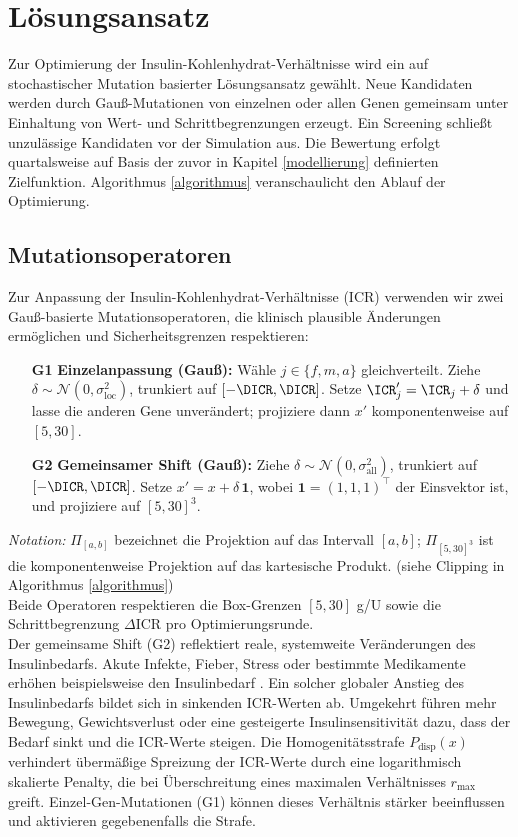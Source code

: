 \newcommand{\sigmaall}{\sigma_{\text{all}}}
\newcommand{\sigmaloc}{\sigma_{\text{loc}}}

\section{Lösungsansatz}
Zur Optimierung der Insulin-Kohlenhydrat-Verhältnisse wird ein auf stochastischer Mutation basierter Lösungsansatz gewählt. Neue Kandidaten werden durch Gauß-Mutationen von einzelnen oder allen Genen gemeinsam unter Einhaltung von Wert- und Schrittbegrenzungen erzeugt. Ein Screening schließt unzulässige Kandidaten vor der Simulation aus. Die Bewertung erfolgt quartalsweise auf Basis der zuvor in Kapitel \ref{modellierung} definierten Zielfunktion. Algorithmus \ref{algorithmus} veranschaulicht den Ablauf der Optimierung.

\subsection{Mutationsoperatoren} \label{Mutationsoperatoren}
Zur Anpassung der Insulin-Kohlenhydrat-Verhältnisse (ICR) verwenden wir zwei Gauß-basierte Mutationsoperatoren, die klinisch plausible Änderungen ermöglichen und Sicherheitsgrenzen respektieren:
\begin{itemize}
  \item[\textbf{G1}] \textbf{Einzelanpassung (Gauß):} Wähle \(j\in\{f,m,a\}\) gleichverteilt. Ziehe \(\delta \sim \mathcal N(0,\sigmaloc^{2})\), trunkiert auf \([-\DICR,\DICR]\). Setze \(\ICR'_j=\ICR_j+\delta\) und lasse die anderen Gene unverändert; projiziere dann \(x'\) komponentenweise auf \([5,30]\).
  \item[\textbf{G2}] \textbf{Gemeinsamer Shift (Gauß):} Ziehe \(\delta \sim \mathcal N(0,\sigmaall^{2})\), trunkiert auf \([-\DICR,\DICR]\). Setze \(x' = x + \delta\,\mathbf{1}\), wobei \(\mathbf{1}=(1,1,1)^\top\) der Einsvektor ist, und projiziere auf \([5,30]^3\).
\end{itemize}
\emph{Notation:} \(\Pi_{[a,b]}\) bezeichnet die Projektion auf das Intervall \([a,b]\); \(\Pi_{[5,30]^3}\) ist die komponentenweise Projektion auf das kartesische Produkt. (siehe Clipping in Algorithmus \ref{algorithmus})\\
Beide Operatoren respektieren die Box-Grenzen $[5, 30]$ g/U sowie die Schrittbegrenzung $\Delta \text{ICR}$ pro Optimierungsrunde. \\

\noindent Der gemeinsame Shift (G2) reflektiert reale, systemweite Veränderungen des Insulinbedarfs. Akute Infekte, Fieber, Stress oder bestimmte Medikamente erhöhen beispielsweise den Insulinbedarf \cite{ada2024standards,cengiz2022ispad}. Ein solcher globaler Anstieg des Insulinbedarfs bildet sich in sinkenden ICR-Werten ab. Umgekehrt führen mehr Bewegung, Gewichtsverlust oder eine gesteigerte Insulinsensitivität dazu, dass der Bedarf sinkt und die ICR-Werte steigen. Die Homogenitätsstrafe $P_{\text{disp}}(x)$ verhindert übermäßige Spreizung der ICR-Werte durch eine logarithmisch skalierte Penalty, die bei Überschreitung eines maximalen Verhältnisses $r_{\text{max}}$ greift. Einzel-Gen-Mutationen (G1) können dieses Verhältnis stärker beeinflussen und aktivieren gegebenenfalls die Strafe.

